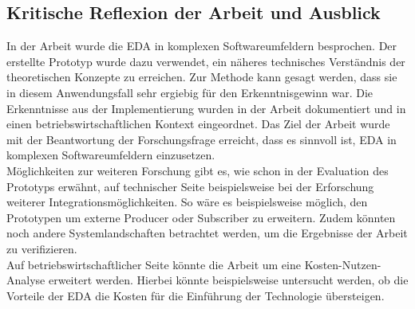 \subsection{Kritische Reflexion der Arbeit und Ausblick}
In der Arbeit wurde die \ac{EDA} in komplexen Softwareumfeldern besprochen. Der erstellte Prototyp wurde dazu verwendet, ein näheres technisches Verständnis der theoretischen Konzepte zu erreichen. Zur Methode kann gesagt werden, dass sie in diesem Anwendungsfall sehr ergiebig für den Erkenntnisgewinn war. Die Erkenntnisse aus der Implementierung wurden in der Arbeit dokumentiert und in einen betriebswirtschaftlichen Kontext eingeordnet. Das Ziel der Arbeit wurde mit der Beantwortung der Forschungsfrage erreicht, dass es sinnvoll ist, \ac{EDA} in komplexen Softwareumfeldern einzusetzen. \\
Möglichkeiten zur weiteren Forschung gibt es, wie schon in der Evaluation des Prototyps erwähnt, auf technischer Seite beispielsweise bei der Erforschung weiterer Integrationsmöglichkeiten. So wäre es beispielsweise möglich, den Prototypen um externe Producer oder Subscriber zu erweitern. Zudem könnten noch andere Systemlandschaften betrachtet werden, um die Ergebnisse der Arbeit zu verifizieren. \\
Auf betriebswirtschaftlicher Seite könnte die Arbeit um eine Kosten-Nutzen-Analyse erweitert werden. Hierbei könnte beispielsweise untersucht werden, ob die Vorteile der \ac{EDA} die Kosten für die Einführung der Technologie übersteigen. \\
